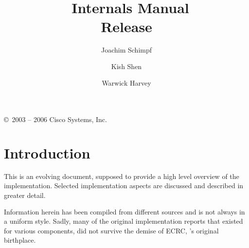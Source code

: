 \documentclass[11pt,a4paper]{book}
\title{{\Huge \eclipse\ Internals Manual}\\
	\vspace{1cm}
	Release \eclipseversion
    }
\author{
Joachim Schimpf
\and Kish Shen
\and Warwick Harvey
}
\begin{document}
\maketitle

\setcounter{page}{2}
\pagestyle{empty}

\vfill

\copyright\ 2003 -- 2006 Cisco Systems, Inc.

\bigskip\bigskip\bigskip\bigskip\bigskip\bigskip

\cleardoublepage
\pagestyle{plain}

\begin{latexonly}
\tableofcontents
\listoffigures
\end{latexonly}

\cleardoublepage
{}

\chapter{Introduction}
This is an evolving document, supposed to provide a high level
overview of the {\eclipse} implementation.
Selected implementation aspects are discussed and described in
greater detail.

Information herein has been compiled from different
sources and is not always in a uniform style. Sadly, many of
the original implementation reports that existed for various
components, did not survive the demise of ECRC, {\eclipse}'s
original birthplace.


\end{document}
